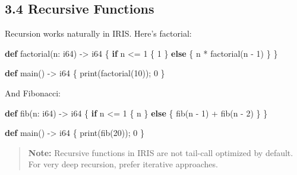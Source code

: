 \documentclass[
  english,
]{book}
\newenvironment{Shaded}{\begin{snugshade}}{\end{snugshade}}
\newcommand{\ControlFlowTok}[1]{\textcolor[rgb]{0.77,0.53,0.75}{\textbf{#1}}}
\newcommand{\DataTypeTok}[1]{\textcolor[rgb]{0.31,0.79,0.69}{#1}}
\newcommand{\DecValTok}[1]{\textcolor[rgb]{0.71,0.81,0.66}{#1}}
\newcommand{\FunctionTok}[1]{\textcolor[rgb]{0.86,0.86,0.67}{#1}}
\newcommand{\KeywordTok}[1]{\textcolor[rgb]{0.34,0.61,0.84}{\textbf{#1}}}
\newcommand{\NormalTok}[1]{\textcolor[rgb]{0.83,0.83,0.83}{#1}}
\newcommand{\OperatorTok}[1]{\textcolor[rgb]{0.83,0.83,0.83}{#1}}
\begin{document}
\subsection{3.4 Recursive Functions}\label{recursive-functions}

Recursion works naturally in IRIS. Here's factorial:

\begin{Shaded}
\begin{Highlighting}[]
\KeywordTok{def}\NormalTok{ factorial(n: }\DataTypeTok{i64}\NormalTok{) }\OperatorTok{{-}\textgreater{}} \DataTypeTok{i64}\NormalTok{ \{}
    \ControlFlowTok{if}\NormalTok{ n }\OperatorTok{\textless{}=} \DecValTok{1}\NormalTok{ \{}
        \DecValTok{1}
\NormalTok{    \} }\ControlFlowTok{else}\NormalTok{ \{}
\NormalTok{        n }\OperatorTok{*}\NormalTok{ factorial(n }\OperatorTok{{-}} \DecValTok{1}\NormalTok{)}
\NormalTok{    \}}
\NormalTok{\}}

\KeywordTok{def}\NormalTok{ main() }\OperatorTok{{-}\textgreater{}} \DataTypeTok{i64}\NormalTok{ \{}
    \FunctionTok{print}\NormalTok{(factorial(}\DecValTok{10}\NormalTok{));}
    \DecValTok{0}
\NormalTok{\}}
\end{Highlighting}
\end{Shaded}

And Fibonacci:

\begin{Shaded}
\begin{Highlighting}[]
\KeywordTok{def}\NormalTok{ fib(n: }\DataTypeTok{i64}\NormalTok{) }\OperatorTok{{-}\textgreater{}} \DataTypeTok{i64}\NormalTok{ \{}
    \ControlFlowTok{if}\NormalTok{ n }\OperatorTok{\textless{}=} \DecValTok{1}\NormalTok{ \{}
\NormalTok{        n}
\NormalTok{    \} }\ControlFlowTok{else}\NormalTok{ \{}
\NormalTok{        fib(n }\OperatorTok{{-}} \DecValTok{1}\NormalTok{) }\OperatorTok{+}\NormalTok{ fib(n }\OperatorTok{{-}} \DecValTok{2}\NormalTok{)}
\NormalTok{    \}}
\NormalTok{\}}

\KeywordTok{def}\NormalTok{ main() }\OperatorTok{{-}\textgreater{}} \DataTypeTok{i64}\NormalTok{ \{}
    \FunctionTok{print}\NormalTok{(fib(}\DecValTok{20}\NormalTok{));}
    \DecValTok{0}
\NormalTok{\}}
\end{Highlighting}
\end{Shaded}

\begin{quote}
\textbf{Note:} Recursive functions in IRIS are not tail-call optimized
by default. For very deep recursion, prefer iterative approaches.
\end{quote}
\end{document}
